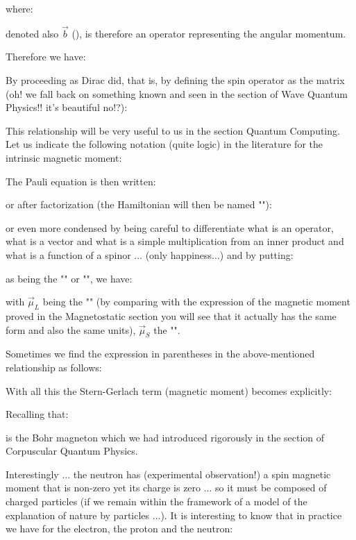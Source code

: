 	where:
	
	denoted also $\vec{b}$ (), is therefore an operator representing the angular momentum.

	Therefore we have:
	
	By proceeding as Dirac did, that is, by defining the spin operator as the matrix (oh! we fall back on something known and seen in the section of Wave Quantum Physics!! it's beautiful no!?)\label{emerging electron spin value}:
	
	This relationship will be very useful to us in the section Quantum Computing. Let us indicate the following notation (quite logic) in the literature for the intrinsic magnetic moment:
	
	The Pauli equation is then written:
	
	or after factorization (the Hamiltonian will then be named "\label{pauli hamiltonian for a constant direction magnetic field}"):
	
	or even more condensed by being careful to differentiate what is an operator, what is a vector and what is a simple multiplication from an inner product and what is a function of a spinor ... (only happiness...) and by putting:
	
	as being the "" or "\label{gyromagnetic factor}", we have:
	
	with $\vec{\mu}_L$ being the "" (by comparing with the expression of the magnetic moment proved in the Magnetostatic section you will see that it actually has the same form and also the same units), $\vec{\mu}_S$ the "".

	Sometimes we find the expression in parentheses in the above-mentioned relationship as follows:
	
	With all this the Stern-Gerlach term (magnetic moment) becomes explicitly:
	
	Recalling that:
	
	is the Bohr magneton which we had introduced rigorously in the section of Corpuscular Quantum Physics.
	
	Interestingly ... the neutron has (experimental observation!) a spin magnetic moment that is non-zero yet its charge is zero ... so it must be composed of charged particles (if we remain within the framework of a model of the explanation of nature by particles ...). It is interesting to know that in practice we have for the electron, the proton and the neutron:
	
